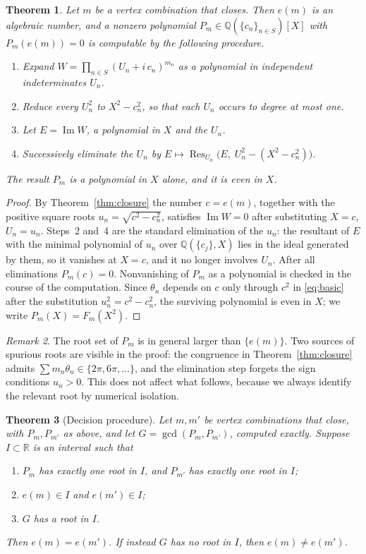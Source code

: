 \documentclass[11pt,a4paper]{article}
\theoremstyle{plain}
\newtheorem{theorem}{Theorem}[section]
\theoremstyle{definition}
\theoremstyle{remark}
\newtheorem{remark}[theorem]{Remark}
\newcommand{\QQ}{\mathbb{Q}}
\newcommand{\RR}{\mathbb{R}}
\DeclareMathOperator{\Res}{Res}
\begin{document}
\begin{theorem}\label{thm:algebraic}
Let $m$ be a vertex combination that closes. Then $e(m)$ is an algebraic number,
and a nonzero polynomial $P_m\in\QQ(\{c_n\}_{n\in S})[X]$ with $P_m(e(m))=0$ is
computable by the following procedure.
\begin{enumerate}
\item Expand $W=\prod_{n\in S}(U_n+i\,c_n)^{m_n}$ as a polynomial in independent
      indeterminates $U_n$.
\item Reduce every $U_n^{2}$ to $X^{2}-c_n^{2}$, so that each $U_n$ occurs to
      degree at most one.
\item Let $E=\operatorname{Im}W$, a polynomial in $X$ and the $U_n$.
\item Successively eliminate the $U_n$ by
      $E\mapsto\Res_{U_n}\!\bigl(E,\;U_n^{2}-(X^{2}-c_n^{2})\bigr)$.
\end{enumerate}
The result $P_m$ is a polynomial in $X$ alone, and it is even in $X$.
\end{theorem}

\begin{proof}
By Theorem~\ref{thm:closure} the number $c=e(m)$, together with the positive
square roots $u_n=\sqrt{c^{2}-c_n^{2}}$, satisfies $\operatorname{Im}W=0$ after
substituting $X=c$, $U_n=u_n$. Steps~2 and~4 are the standard elimination of the
$u_n$: the resultant of $E$ with the minimal polynomial of $u_n$ over
$\QQ(\{c_j\},X)$ lies in the ideal generated by them, so it vanishes at
$X=c$, and it no longer involves $U_n$. After all eliminations $P_m(c)=0$.
Nonvanishing of $P_m$ as a polynomial is checked in the course of the
computation. Since $\theta_n$ depends on $c$ only through $c^{2}$ in
\eqref{eq:basic} after the substitution $u_n^{2}=c^{2}-c_n^{2}$, the surviving
polynomial is even in $X$; we write $P_m(X)=F_m(X^{2})$.
\end{proof}

\begin{remark}
The root set of $P_m$ is in general larger than $\{e(m)\}$. Two sources of
spurious roots are visible in the proof: the congruence in
Theorem~\ref{thm:closure} admits $\sum m_n\theta_n\in\{2\pi,6\pi,\dots\}$, and
the elimination step forgets the sign conditions $u_n>0$. This does not affect
what follows, because we always identify the relevant root by numerical
isolation.
\end{remark}

\begin{theorem}[Decision procedure]\label{thm:decide}
Let $m,m'$ be vertex combinations that close, with $P_m,P_{m'}$ as above, and let
$G=\gcd(P_m,P_{m'})$, computed exactly. Suppose $I\subset\RR$ is an interval such
that
\begin{enumerate}
\item $P_m$ has exactly one root in $I$, and $P_{m'}$ has exactly one root in
      $I$;
\item $e(m)\in I$ and $e(m')\in I$;
\item $G$ has a root in $I$.
\end{enumerate}
Then $e(m)=e(m')$. If instead $G$ has no root in $I$, then $e(m)\ne e(m')$.
\end{theorem}
\end{document}
